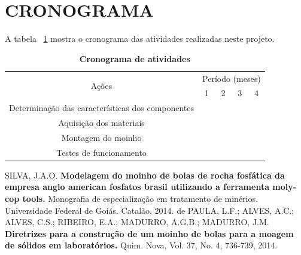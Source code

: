 \documentclass[a4paper, 12pt, brazil]{article}
\begin{document}
\newpage
\section{CRONOGRAMA}

\par
A tabela ~\ref{tab:Tabela 1} mostra o cronograma das atividades realizadas neste projeto.

\begin{table}[!ht]
        \caption{\label{tab:Tabela 1} \textbf{Cronograma de atividades}}
        \centering
\begin{tabular}{|c|c|c|c|c|}
\hline
\multirow{2}{*}{Ações} & \multicolumn{4}{c|}{Período (meses)} \\ \cline{2-5}
 & 1 & 2 & 3 & 4 \\ \hline
	Determinação das características dos componentes & \cellcolor[gray]{0.6} & &  & \\ \hline
	Aquisição dos materiais & & \cellcolor[gray]{0.6} & & \\ \hline
	Montagem do moinho & & \cellcolor[gray]{0.6} & \cellcolor[gray]{0.6} & \\ \hline
	Testes de funcionamento & & & & \cellcolor[gray]{0.6} \\ \hline
\end{tabular}
\end{table}

\newpage
\begin{thebibliography}{99}
    SILVA, J.A.O. \textbf{Modelagem do moinho de bolas de rocha fosfática da empresa anglo american fosfatos brasil utilizando a ferramenta moly-cop tools.} Monografia de especialização em tratamento de minérios. Universidade Federal de Goiás. Catalão, 2014. 
	de PAULA, L.F.; ALVES, A.C.; ALVES, C.S.; RIBEIRO, E.A.; MADURRO, A.G.B.; MADURRO, J.M. \textbf{Diretrizes para a construção de um moinho de bolas para a moagem de sólidos em laboratórios.} Quim. Nova, Vol. 37, No. 4, 736-739, 2014.
\end{thebibliography}
\noindent
\end{document}

